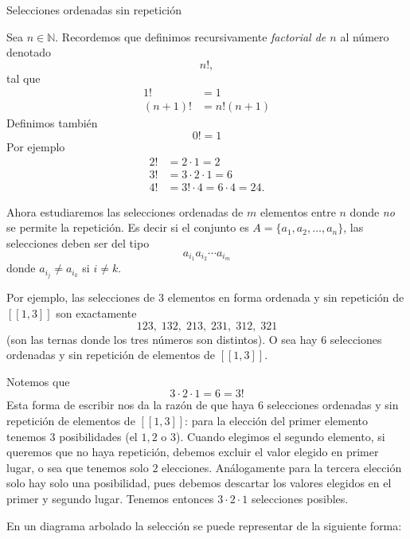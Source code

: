 \begin{section}{Selecciones ordenadas sin repetición}\label{permutaciones}

Sea $n \in \mathbb{N}$. Recordemos  que  definimos recursivamente \emph{factorial de $n$} al número denotado 
$$n!,$$
tal que
\begin{align*}
1! &= 1\\
(n + 1)! &= n!  (n + 1)
\end{align*}
Definimos también
$$0! = 1$$
Por ejemplo
\begin{align*}
2! &= 2 \cdot 1 = 2 \\
3! &= 3 \cdot 2 \cdot 1 = 6 \\
4! &= 3!\cdot 4 = 6 \cdot 4 = 24. 
\end{align*}


Ahora estudiaremos las selecciones ordenadas de $m$ elementos entre $n$ donde {\em no} se permite la repetición. Es decir si  el conjunto es $A= \{a_1,a_2,\ldots,a_n\}$, las selecciones deben ser del tipo 
$$
a_{i_1} a_{i_2} \cdots a_{i_m}
$$
donde  $a_{i_j} \not= a_{i_k}$ si $i\not=k$. 

Por ejemplo, las selecciones de $3$ elementos en forma ordenada y sin repetición de $[[1, 3]]$  son exactamente
$$
1 2 3,\; 1 3 2,\; 2 1 3,\; 2 3 1,\; 3 1 2,\; 3 2 1
$$
(son las ternas donde los tres números son distintos). O sea hay $6$ selecciones ordenadas y sin repetición de  elementos de $[[1, 3]]$.

Notemos que
$$
3 \cdot 2 \cdot 1 = 6 = 3!
$$
Esta forma de escribir nos da la razón de que haya $6$ selecciones ordenadas y sin repetición de  elementos de $[[1, 3]]$: para la elección del primer elemento tenemos $3$ posibilidades (el $1, 2$ o $3$). Cuando elegimos el segundo elemento, si queremos que no haya repetición, debemos excluir el valor elegido en primer lugar, o sea que tenemos solo $2$ elecciones. Análogamente para la tercera elección solo hay solo una posibilidad, pues debemos descartar los valores elegidos en el primer y segundo lugar. Tenemos entonces  $3 \cdot 2 \cdot 1$ selecciones posibles.

En un diagrama arbolado la selección se puede representar de la siguiente forma:


\end{section}
